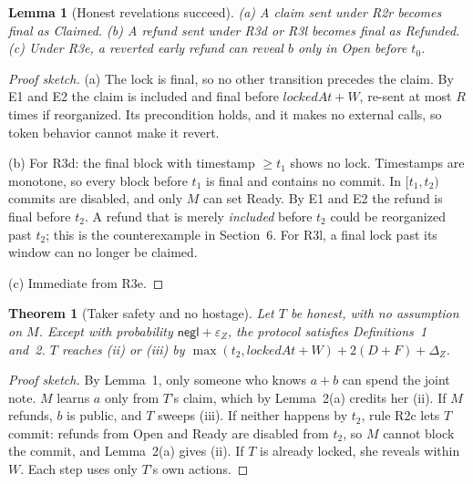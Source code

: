 \documentclass[10pt,letterpaper]{article}
\theoremstyle{plain}
\newtheorem{theorem}{Theorem}
\newtheorem{lemma}{Lemma}
\theoremstyle{definition}
\newcommand{\st}[1]{\textsf{#1}}
\begin{document}
\begin{lemma}[Honest revelations succeed]
(a) A claim sent under R2r becomes final as \st{Claimed}. (b) A refund sent under R3d or R3l
becomes final as \st{Refunded}. (c) Under R3e, a reverted early refund can reveal $b$ only in
\st{Open} before $t_0$.
\end{lemma}
\begin{proof}[Proof sketch]
(a) The lock is final, so no other transition precedes the claim. By E1 and E2 the claim is
included and final before $\mathit{lockedAt}+W$, re-sent at most $R$ times if reorganized. Its
precondition holds, and it makes no external calls, so token behavior cannot make it revert.

(b) For R3d: the final block with timestamp $\ge t_1$ shows no lock. Timestamps are monotone, so
every block before $t_1$ is final and contains no commit. In $[t_1, t_2)$ commits are disabled,
and only $M$ can set Ready. By E1 and E2 the refund is final before $t_2$. A refund that is merely
\emph{included} before $t_2$ could be reorganized past $t_2$; this is the counterexample in
Section~6. For R3l, a final lock past its window can no longer be claimed.

(c) Immediate from R3e.
\end{proof}

\begin{theorem}[Taker safety and no hostage]
Let $T$ be honest, with no assumption on $M$. Except with probability
$\mathsf{negl}+\varepsilon_Z$, the protocol satisfies Definitions~1 and~2. $T$ reaches (ii) or
(iii) by $\max(t_2, \mathit{lockedAt}+W) + 2(D+F) + \Delta_Z$.
\end{theorem}
\begin{proof}[Proof sketch]
By Lemma~1, only someone who knows $a+b$ can spend the joint note. $M$ learns $a$ only from $T$'s
claim, which by Lemma~2(a) credits her (ii). If $M$ refunds, $b$ is public, and $T$ sweeps (iii).
If neither happens by $t_2$, rule R2c lets $T$ commit: refunds from \st{Open} and \st{Ready} are
disabled from $t_2$, so $M$ cannot block the commit, and Lemma~2(a) gives (ii). If $T$ is already
locked, she reveals within $W$. Each step uses only $T$'s own actions.
\end{proof}
\end{document}

